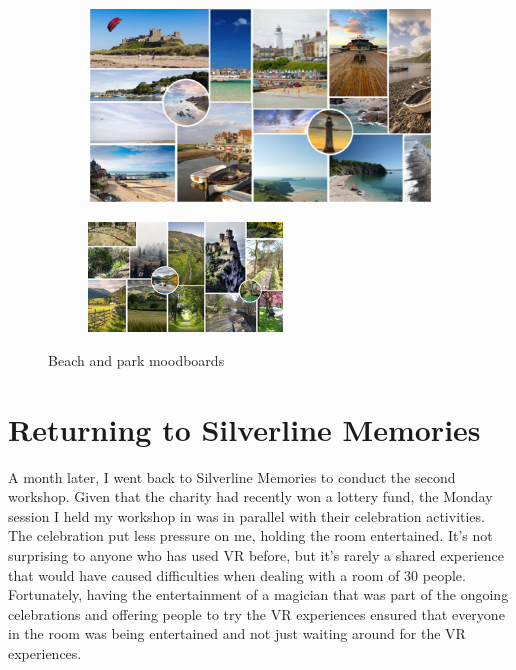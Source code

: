 \begin{figure}
\centering
\begin{subfigure}{.5\textwidth}
  \centering
  \includegraphics[width=.8\linewidth]{Images/ChapterFour/MoodboardOne.png}
  \label{fig:moodboardOne}
\end{subfigure}%
\begin{subfigure}{.5\textwidth}
  \centering
  \includegraphics[width=.8\linewidth]{Images/ChapterFour/MoodboardTwo.png}
  \label{fig:moodboardTwo}
\end{subfigure}
\caption{Beach and park moodboards}
\label{fig:VRMoodboards}
\end{figure}

\section{Returning to Silverline Memories}
\label{Relationships:Returning}
A month later, I went back to Silverline Memories to conduct the second workshop. Given that the charity had recently won a lottery fund, the Monday session I held my workshop in was in parallel with their celebration activities. The celebration put less pressure on me, holding the room entertained. It's not surprising to anyone who has used VR before, but it's rarely a shared experience that would have caused difficulties when dealing with a room of 30 people. Fortunately, having the entertainment of a magician that was part of the ongoing celebrations and offering people to try the VR experiences ensured that everyone in the room was being entertained and not just waiting around for the VR experiences.

